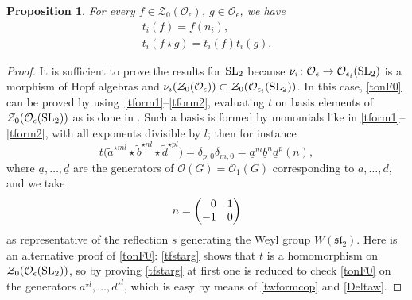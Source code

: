 \documentclass[pdftex]{sigma}
\numberwithin{equation}{section}
\newtheorem{prop}[teo]{Proposition}
\theoremstyle{definition}
\newcommand{\e}{\epsilon}
\newcommand{\Oo}{{\mathcal O}}
\begin{document}
\begin{prop}\label{tidstar} For every $f\in \mathcal{Z}_0(\Oo_\e)$, $g\in {\mathcal O}_\epsilon$, we have
\begin{gather}
t_i(f)=f(n_i), \label{tonF0} \\
t_i(f\star g)=t_i(f)t_i(g).\label{tfstarg}
\end{gather}
\end{prop}
\begin{proof} It is sufficient to prove the results for ${\rm SL}_2$ because $\nu_i\colon {\mathcal O}_\epsilon \rightarrow
{\mathcal O}_{\epsilon_i} ({\rm SL}_2)$ is a morphism of Hopf algebras and $\nu_i(\mathcal{Z}_0(\Oo_\e))\subset \mathcal{Z}_0(\Oo_{\e_i}({\rm SL}_2))$. In this case, \eqref{tonF0} can be proved by using~\mbox{\eqref{tform1}--\eqref{tform2}}, evaluating $t$ on basis elements of $\mathcal{Z}_0(\Oo_\e({\rm SL}_2))$ as is done in \cite[Lemma~1.5\,(a)]{DC-L}. Such a basis is formed by monomials like in \eqref{tform1}--\eqref{tform2}, with all exponents divisible by $l$; then for instance
\[t\big(\tilde{a}^{\star m l}\star \tilde{b}^{\star n l}\star \tilde{d}^{\star p l}\big)=\delta_{p,0}\delta_{m,0} = \underline{a}^m\underline{b}^n\underline{d}^p (n),
\]
where $\underline{a},\dots,\underline{d}$ are the generators of $\Oo(G) = \Oo_1(G)$ corresponding to $a,\dots,d$, and we take
\[n=\left(\begin{matrix} \hphantom{-}0 & 1 \\ -1 & 0\end{matrix}\right)\]
as representative of the reflection $s$ generating the Weyl group $W({\mathfrak{sl}_2})$. Here is an alternative proof of \eqref{tonF0}: \eqref{tfstarg} shows that $t$ is a homomorphism on $\mathcal{Z}_0(\Oo_\e({\rm SL}_2))$, so by proving \eqref{tfstarg} at first one is reduced to check \eqref{tonF0} on the generators $a^{\star l},\dots,d^{\star l}$, which is easy by means of \eqref{twformcop} and \eqref{Deltaw}.


\end{proof}
\end{document}
